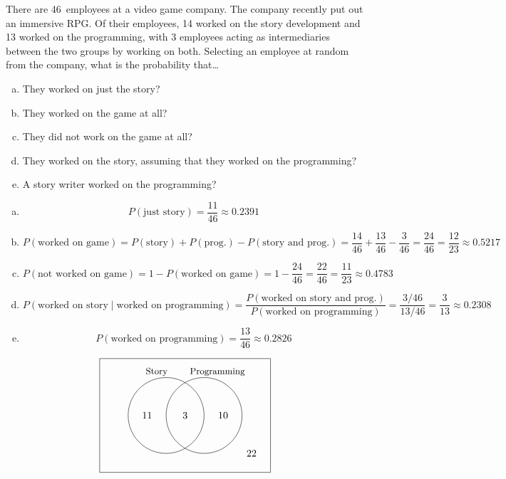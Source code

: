 \documentclass[11pt,letterpaper]{article}
\begin{document}

 There are 46~employees at a video game company. The company recently put out an immersive RPG. Of their employees, 14 worked on the story development and 13 worked on the programming, with 3 employees acting as intermediaries between the two groups by working on both. Selecting an employee at random from the company, what is the probability that\dots
        \begin{enumerate}[(a)]
        \item They worked on just the story?
        \item They worked on the game at all?
        \item They did not work on the game at all?
        \item They worked on the story, assuming that they worked on the programming?
        \item A story writer worked on the programming?
        \end{enumerate} \pspace

\sol 
\begin{enumerate}[(a)]
\item 
	\[
	P(\text{just story})= \dfrac{11}{46} \approx 0.2391
	\] 

\item 
	\[
	P(\text{worked on game})= P(\text{story}) + P(\text{prog.}) - P(\text{story and prog.})= \dfrac{14}{46} + \dfrac{13}{46} - \dfrac{3}{46}= \dfrac{24}{46}= \dfrac{12}{23} \approx 0.5217
	\] 

\item 
	\[
	P(\text{not worked on game})= 1 - P(\text{worked on game})= 1 - \dfrac{24}{46}= \dfrac{22}{46}= \dfrac{11}{23} \approx 0.4783
	\] 

\item 
	\[
	P( \text{worked on story} \mid \text{worked on programming})= \dfrac{P(\text{worked on story and prog.})}{P(\text{worked on programming})}= \dfrac{3/46}{13/46}= \dfrac{3}{13} \approx 0.2308
	\] 

\item 
	\[
	P(\text{worked on programming})= \dfrac{13}{46} \approx 0.2826
	\]
\end{enumerate} \vfill

	\[
	\begin{tikzpicture}[scale=0.67]
	\draw (0,0) rectangle (9,6);
	\draw (3.5,3) circle (2);
	\draw (5.5,3) circle (2);
	
	\node at (3.0,5.3) {\small Story};
	\node at (6.2,5.3) {\small Programming}; 
	
	\node at (2.5,3) {11};
	\node at (4.5,3) {3};
	\node at (6.5,3) {10};
	\node at (8,1) {22};
	\end{tikzpicture}
	\]
\end{document}
